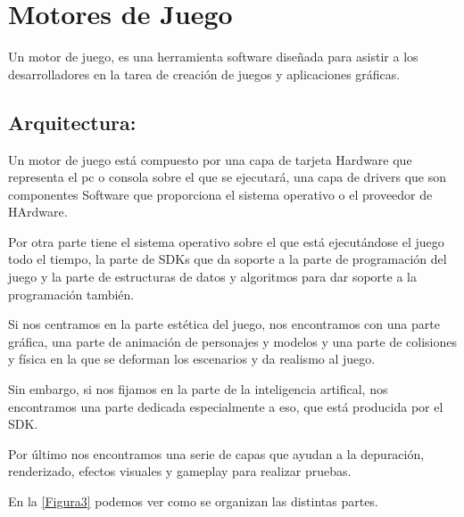 \chapter[Motores de Juego]{\label{identificadorReferenciaCruzada}
Motores de Juego}


Un motor de juego, es una herramienta software diseñada para asistir a los desarrolladores en la tarea de creación de juegos y aplicaciones gráficas\cite{B9}.

\section{Arquitectura:}

Un motor de juego está compuesto por una capa de tarjeta Hardware que representa el pc o consola sobre el que se ejecutará, una capa de drivers que son componentes Software que proporciona el sistema operativo o el proveedor de HArdware.

Por otra parte tiene el sistema operativo sobre el que está ejecutándose el juego todo el tiempo, la parte de SDKs que da soporte a la parte de programación del juego y la parte de estructuras de datos y algoritmos para dar soporte a la programación también.

Si nos centramos en la parte estética del juego, nos encontramos con una parte gráfica, una parte de animación de personajes y modelos y una parte de colisiones y física en la que se deforman los escenarios y da realismo al juego.

Sin embargo, si nos fijamos en la parte de la inteligencia artifical, nos encontramos una parte dedicada especialmente a eso, que está producida por el SDK.

Por último nos encontramos una serie de capas que ayudan a la depuración, renderizado, efectos visuales y gameplay para realizar pruebas.

En la \ref{Figura3} podemos ver como se organizan las distintas partes.

